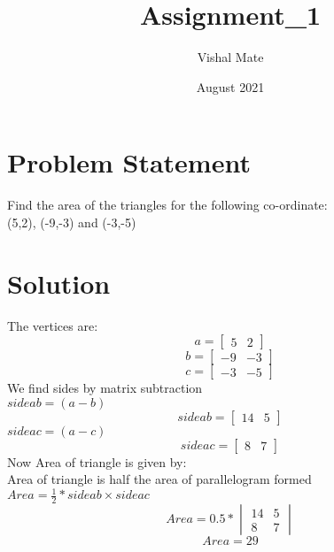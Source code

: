 \documentclass{article}
\title{Assignment_1}
\author{Vishal Mate}
\date{August 2021}
\begin{document}
\section{Problem Statement}
Find the area of the triangles for the following co-ordinate:\\
(5,2), (-9,-3) and (-3,-5)

\section{Solution}

The vertices are:
 $$a= \begin{bmatrix} 
     5 & 2 
  \end{bmatrix}$$
 $$b= \begin{bmatrix} 
    -9 & -3 
  \end{bmatrix}$$
 $$c =\begin{bmatrix} 
    -3 & -5 
  \end{bmatrix}$$
  We find sides by matrix subtraction\\ 
  $ sideab=(a-b)$\\
  $$sideab= \begin{bmatrix} 
     14 & 5 
  \end{bmatrix}$$
  $ sideac=(a-c)$\\
    $$sideac= \begin{bmatrix} 
     8 & 7 
  \end{bmatrix}$$
  Now Area of triangle is given by:\\
  Area of triangle is half the area of parallelogram formed
  $Area= \frac{1}{2}*sideab \times sideac$
$$Area =0.5*\begin{vmatrix} 14 & 5 \\ 8 & 7 \end{vmatrix} $$
$$Area = 29 $$
\end{document}
